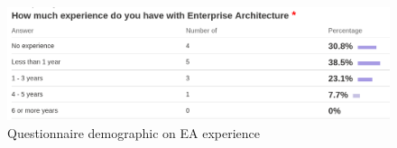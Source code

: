 \begin{figure}
    \centering
    \includegraphics[scale=0.35]{figures/png/questionnaire_EA_Experience.png}
    \caption{Questionnaire demographic on EA experience}
    \label{fig:questionnaire-ea-experience}
\end{figure}
